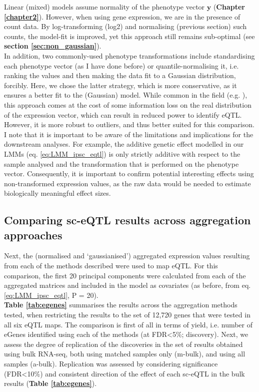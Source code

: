 Linear (mixed) models assume normality of the phenotype vector $\mathbf{y}$ (\textbf{Chapter \ref{chapter2}}).
However, when using gene expression, we are in the presence of count data.
By log-transforming (log2) and normalising (previous section) such counts, the model-fit is improved, yet this approach still remains sub-optimal (see \textbf{section \ref{sec:non_gaussian}}). \\

In addition, two commonly-used phenotype transformations include standardising each phenotype vector (as I have done before) or quantile-normalising it, i.e. ranking the values and then making the data fit to a Gaussian distribution, forcibly.
Here, we chose the latter strategy, which is more conservative, as it ensures a better fit to the (Gaussian) model.
While common in the field (e.g. \cite{aguet2019gtex, kerimov2020eqtl}), this approach comes at the cost of some information loss on the real distribution of the expression vector, which can result in reduced power to identify eQTL.
However, it is more robust to outliers, and thus better suited for this comparison.
I note that it is important to be aware of the limitations and implications for the downstream analyses. 
For example, the additive genetic effect modelled in our LMMs (eq. \eqref{eq:LMM_ipsc_eqtl}) is only strictly additive with respect to the sample analysed and the transformation that is performed on the phenotype vector. 
Consequently, it is important to confirm potential interesting effects using non-transformed expression values, as the raw data would be needed to estimate biologically meaningful effect sizes.

\newpage

\subsection{Comparing sc-eQTL results across aggregation approaches}

Next, the (normalised and `gaussianised') aggregated expression values resulting from each of the methods described were used to map eQTL.
For this comparison, the first 20 principal components were calculated from each of the aggregated matrices and included in the model as covariates (as before, from eq. \eqref{eq:LMM_ipsc_eqtl}, P = 20). \\

\textbf{Table \ref{tab:egenes}} summarises the results across the aggregation methods tested, when restricting the results to the set of 12,720 genes that were tested in all six eQTL maps.
The comparison is first of all in terms of yield, i.e. number of eGenes identified using each of the methods (at FDR<5\%; discovery).
Next, we assess the degree of replication of the discoveries in the set of results obtained using bulk RNA-seq, both using matched samples only (m-bulk), and using all samples (a-bulk).
Replication was assessed by considering significance (FDR<10\%) and consistent direction of the effect of each sc-eQTL in the bulk results (\textbf{Table \ref{tab:egenes}}).\\

